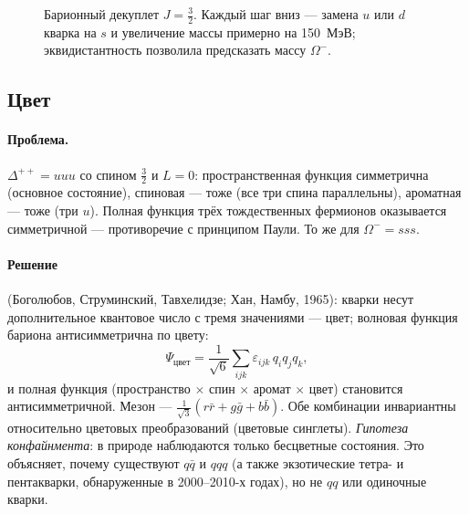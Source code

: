 \begin{figure}[htbp]
\centering
{}
\caption{Барионный декуплет $J=\frac32$. Каждый шаг вниз — замена $u$ или $d$ кварка на $s$ и увеличение массы
примерно на 150~МэВ; эквидистантность позволила предсказать массу $\Omega^-$.}
\label{fig:15:decuplet}
\end{figure}

\subsection{Цвет}

\paragraph{Проблема.} $\Delta^{++}=uuu$ со спином $\frac32$ и $L=0$: пространственная функция симметрична (основное
состояние), спиновая — тоже (все три спина параллельны), ароматная — тоже (три $u$). Полная функция трёх
тождественных фермионов оказывается симметричной — противоречие с принципом Паули. То же для $\Omega^-=sss$.

\paragraph{Решение} (Боголюбов, Струминский, Тавхелидзе; Хан, Намбу, 1965): кварки несут дополнительное
квантовое число с тремя значениями — цвет; волновая функция бариона антисимметрична по цвету:
\[
  \Psi_{\text{цвет}}=\frac{1}{\sqrt6}\sum_{ijk}\varepsilon_{ijk}\,q_iq_jq_k ,
\]
и полная функция (пространство $\times$ спин $\times$ аромат $\times$ цвет) становится антисимметричной. Мезон —
$\frac{1}{\sqrt3}(r\bar r+g\bar g+b\bar b)$. Обе комбинации инвариантны относительно цветовых преобразований
(цветовые синглеты). \emph{Гипотеза конфайнмента}: в природе наблюдаются только бесцветные состояния. Это
объясняет, почему существуют $q\bar q$ и $qqq$ (а также экзотические тетра- и пентакварки, обнаруженные в 2000--2010-х годах), но
не $qq$ или одиночные кварки.

